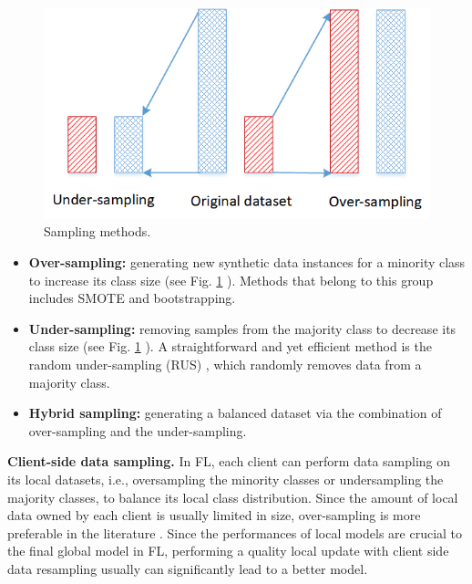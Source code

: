 \documentclass[10pt,journal,compsoc]{IEEEtran}
\begin{document}
\begin{figure}[htbp]
	\centering
		\setlength{\abovecaptionskip}{-0.2cm}
	\includegraphics[scale=0.7]{sampling.png}
	\caption{Sampling methods. }
	\label{Sampling methods}
\end{figure}

\begin{itemize}
\item  \textbf{Over-sampling:} generating new synthetic data instances for a minority class to increase its class size (see Fig. \ref{Sampling methods} ). Methods that belong to this group includes SMOTE \cite{chawla2002smote} and bootstrapping. 

\item \textbf{Under-sampling:} removing samples from the majority class to decrease its class size (see Fig. \ref{Sampling methods} ). A straightforward and yet efficient method is the random under-sampling (RUS) \cite{tahir2009multiple}, which randomly removes data from a majority class.

\item  \textbf{Hybrid sampling:} generating a balanced dataset via the combination of over-sampling and the under-sampling.
\end{itemize}

\textbf{Client-side data sampling.} In FL, each client can perform data sampling on its local datasets, i.e., oversampling the minority classes or undersampling the majority classes, to balance its local class distribution. Since the amount of local data owned by each client is usually limited in size, over-sampling is more preferable in the literature \cite{shingi2020federated} \cite{weinger2022enhancing}. Since the performances of local models are crucial to the final global model in FL, performing a quality local update with client side data resampling usually can significantly lead to a better model. 
\end{document}
